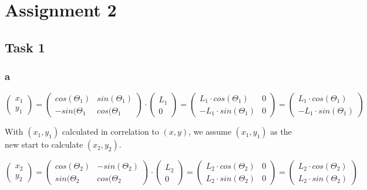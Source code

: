 \chapter{Assignment 2}\label{ass2}

\section{Task 1}\label{ass2_t1}

\subsection{a}\label{ass2_t1_a}

\begin{equation}
  \begin{pmatrix}
    x_{1} \\
    y_{1}
  \end{pmatrix}
  =
  \begin{pmatrix}
    cos(\Theta_{1})  &  sin(\Theta_{1}) \\
    -sin(\Theta_{1}  &  cos(\Theta_{1}
  \end{pmatrix}
  \cdot
  \begin{pmatrix}
    L_{1} \\
    0
  \end{pmatrix}
  =
  \begin{pmatrix}
    L_{1}\cdot cos(\Theta_{1})   & 0 \\
    -L_{1}\cdot sin(\Theta_{1})  & 0
  \end{pmatrix}
  =
  \begin{pmatrix}
    L_{1}\cdot cos(\Theta_{1}) \\
    -L_{1}\cdot sin(\Theta_{1})
  \end{pmatrix}
\end{equation}

With $(x_{1}, y_{1})$ calculated in correlation to $(x, y)$, we assume $(x_{1}, y_{1})$ as the new start to calculate $(x_{2}, y_{2})$.

\begin{equation}
  \begin{pmatrix}
    x_{2} \\
    y_{2}
  \end{pmatrix}
  =
  \begin{pmatrix}
    cos(\Theta_{2})  &  -sin(\Theta_{2}) \\
    sin(\Theta_{2}  &  cos(\Theta_{2}
  \end{pmatrix}
  \cdot
  \begin{pmatrix}
    L_{2} \\
    0
  \end{pmatrix}
  =
  \begin{pmatrix}
    L_{2}\cdot cos(\Theta_{2})   & 0 \\
    L_{2}\cdot sin(\Theta_{2})  & 0
  \end{pmatrix}
  =
  \begin{pmatrix}
    L_{2}\cdot cos(\Theta_{2}) \\
    L_{2}\cdot sin(\Theta_{2})
  \end{pmatrix}
\end{equation}

